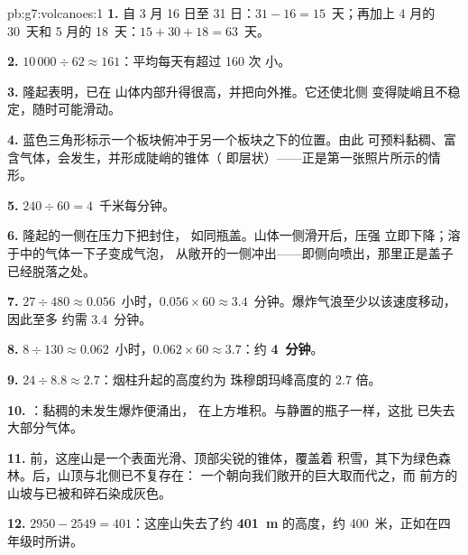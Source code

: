 \begin{solution}{pb:g7:volcanoes:1}
\textbf{1.} 自 3 月 16 日至 31 日：$31 - 16 = 15$~天；再加上
4 月的 30~天和 5 月的 18~天：$15 + 30 + 18 = 63$~天。

\textbf{2.} $10\,000 \div 62 \approx 161$：平均每天有超过 160 次
小。

\textbf{3.} 隆起表明，已在
山体内部升得很高，并把向外推。它还使北侧
变得陡峭且不稳定，随时可能滑动。

\textbf{4.} 蓝色三角形标示一个板块俯冲于另一个板块之下的位置。由此
可预料黏稠、富含气体，会发生，并形成陡峭的锥体（
即层状）——正是第一张照片所示的情形。

\textbf{5.} $240 \div 60 = 4$~千米每分钟。

\textbf{6.} 隆起的一侧在压力下把封住，
如同瓶盖。山体一侧滑开后，压强
立即下降；溶于中的气体一下子变成气泡，
从敞开的一侧冲出——即侧向喷出，那里正是盖子已经脱落之处。

\textbf{7.} $27 \div 480 \approx 0.056$~小时，$0.056 \times 60 \approx
3.4$~分钟。爆炸气浪至少以该速度移动，因此至多
约需 3.4~分钟。

\textbf{8.} $8 \div 130 \approx 0.062$~小时，$0.062 \times 60 \approx
3.7$：约 \textbf{4~分钟}。

\textbf{9.} $24 \div 8.8 \approx 2.7$：烟柱升起的高度约为
珠穆朗玛峰高度的 2.7 倍。

\textbf{10.} ：黏稠的未发生爆炸便涌出，
在上方堆积。与静置的瓶子一样，这批
已失去大部分气体。

\textbf{11.} 前，这座山是一个表面光滑、顶部尖锐的锥体，覆盖着
积雪，其下为绿色森林。后，山顶与北侧已不复存在：
一个朝向我们敞开的巨大取而代之，而
前方的山坡与已被和碎石染成灰色。

\textbf{12.} $2950 - 2549 = 401$：这座山失去了约
\textbf{401~m} 的高度，约 400~米，正如在四年级时所讲。
\end{solution}
